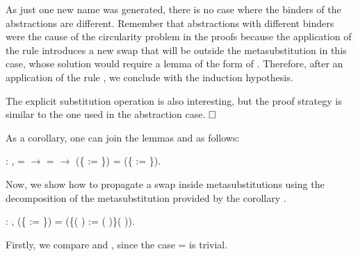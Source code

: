 \begin{coqdoccode}
\end{coqdoccode}
As just one new name was generated, there is no case where the binders of the abstractions are different. Remember that abstractions with different binders were the cause of the circularity problem in the proofs because the application of the rule  introduces a new swap that will be outside the metasubstitution in this case, whose solution would require a lemma of the form of . Therefore, after an application of the rule , we conclude with the induction hypothesis.
\begin{coqdoccode}
\end{coqdoccode}
The explicit substitution operation is also interesting, but the proof strategy is similar to the one used in the abstraction case. $\hfill\Box$
\begin{coqdoccode}
\coqdocemptyline
\end{coqdoccode}
As a corollary, one can join the lemmas  and  as follows:
\begin{coqdoccode}
\coqdocemptyline
\coqdocnoindent
{} : \coqdockw{\ensuremath{\forall}}     ,  =  \ensuremath{\rightarrow}  =  \ensuremath{\rightarrow} (\{ := \}) = (\{ := \}).\coqdoceol
\coqdocemptyline
\end{coqdoccode}
Now, we show how to propagate a swap inside metasubstitutions using the decomposition of the metasubstitution provided by the corollary .\newline 
\begin{coqdoccode}
\coqdocemptyline
\coqdocnoindent
{} : \coqdockw{\ensuremath{\forall}}     ,    (\{ := \}) = (\{(   ) := (   )\}(   )).\coqdoceol
\end{coqdoccode}
 Firstly, we compare  and , since the case  =  is trivial.
